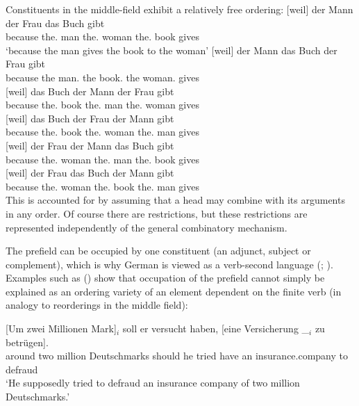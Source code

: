 Constituents in the middle-field exhibit a relatively free ordering:
\eal
\label{bsp-GPSG-anordnung}
\ex 
\gll {}[weil] der Mann der Frau das Buch gibt\\
     {}\spacebr{}because the.\nom{} man the.\dat{} woman the.\acc{} book gives\\
\glt `because the man gives the book to the woman'
\ex 
\gll {}[weil] der Mann das Buch der Frau gibt\\
     {}\spacebr{}because the man.\nom{} the book.\acc{} the woman.\dat{} gives\\
\ex 
\gll {}[weil]          das        Buch der        Mann der        Frau gibt\\
     \spacebr{}because the.\acc{} book the.\nom{} man  the.\dat{} woman gives\\
\ex 
\gll {}[weil] das Buch der Frau der Mann gibt\\
{}\spacebr{}because the.\acc{} book the.\dat{} woman the.\nom{} man gives\\
\ex 
\gll {}[weil] der Frau der Mann das Buch gibt\\
{}\spacebr{}because the.\dat{} woman the.\nom{} man the.\acc{} book gives\\
\ex 
\gll {}[weil] der Frau das Buch der Mann gibt\\
{}\spacebr{}because the.\dat{} woman the.\acc{} book the.\nom{} man gives\\
\zl
This is accounted for by assuming that a head may combine with its arguments in any order. Of course
there are restrictions, but these restrictions are represented independently of the general
combinatory mechanism.

The prefield can be occupied by one constituent (an adjunct, subject or complement), which is why German is
viewed as a verb-second language (\citealp[Chapter~2.4]{Erdmann1886a};
\citealp[, ]{Paul1919a}). Examples such as () show that occupation of the prefield cannot simply be explained as an ordering variety of an element dependent on 
the finite verb (in analogy to reorderings in the middle field):

\ea
\gll{}[Um zwei Millionen Mark]$_i$ soll er versucht haben, [eine Versicherung \_$_i$ zu betrügen].\footnotemark\\
      \spacebr{}around two million Deutschmarks should he tried have \spacebr{}an insurance.company
              {} to defraud\\
\glt `He supposedly tried to defraud an insurance company of two million Deutschmarks.'

